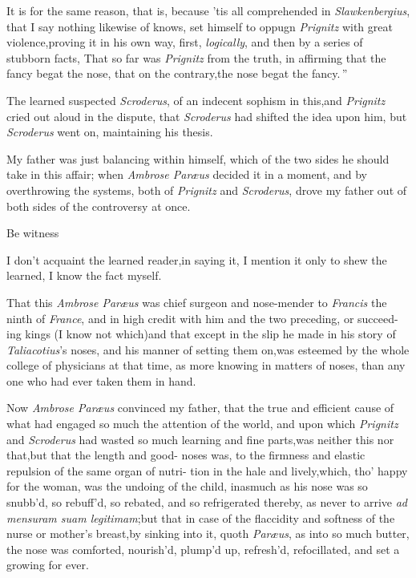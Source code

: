 \documentclass{article}
\begin{document}
It is for the same reason, that is, because ’tis all
comprehended in \textit{Slawkenbergius}, that I say nothing likewise
of  knows, set himself
to oppugn \textit{Prignitz} with great violence,\tsk proving it in
his own way, first, \textit{logically}, and then by a series of
stubborn facts, \lqq That so far was \textit{Prignitz} from
the truth, in affirming that the fancy begat the nose, that on the contrary,\tsk the nose begat
the fancy.\,”

\tsk The learned suspected \textit{Scroderus}, of an indecent
sophism in this,\tsk and \textit{Prignitz} cried out aloud in the
dispute, that \textit{Scroderus} had shifted the idea upon
him,
\tsk but \textit{Scroderus} went on, maintaining his
thesis.\tsh

My father was just balancing within himself, which of the
two sides he should take in this affair; when
\textit{Ambrose Paræus} decided it in a moment, and by
overthrowing the systems, both of \textit{Prignitz} and
\textit{Scroderus}, drove my father out of both sides of the
controversy at once.

Be witness\tsh

I don’t acquaint the learned reader,\tsk in saying it, I
mention it only to shew the learned, I know the fact
myself.\tsh

That this \textit{Ambrose Paræus} was chief surgeon and
nose-mender to \textit{Francis} the ninth of
\textit{France}, and in high credit with him and the two
preceding, or succeed- ing kings (I know not which)\tsk and
that except in the slip he made in his story of
\textit{Taliacotius}’s noses, and his manner of setting them
on,\tsk was esteemed by the whole college of physicians
at that time, as more knowing in matters of noses, than any
one who had ever taken them in hand.

Now \textit{Ambrose Paræus} convinced my father, that the
true and efficient cause of what had engaged so much the attention
of the world, and upon which \textit{Prignitz} and \textit{Scroderus}
had wasted so much learning and fine parts,\tsh was neither
this nor that,\tsh but that the length and good-\break
{}
\break
{}\break
noses was, to the firmness and elastic repulsion of
the same organ of nutri- tion in the hale and lively,\tsk which,
tho’ happy for the woman, was the undoing of the child,
inasmuch as his nose was so snubb’d, so rebuff’d, so
rebated, and so refrigerated thereby, as never to arrive \textit{ad
mensuram suam legitimam};\tsh but that in case of the
flaccidity and softness of the nurse or mother’s
breast,\tsk by sinking into it, quoth \textit{Paræus}, as into so much butter, the
nose was comforted, nourish’d, plump’d up,
refresh’d, refocillated, and set a growing for ever.
\end{document}
